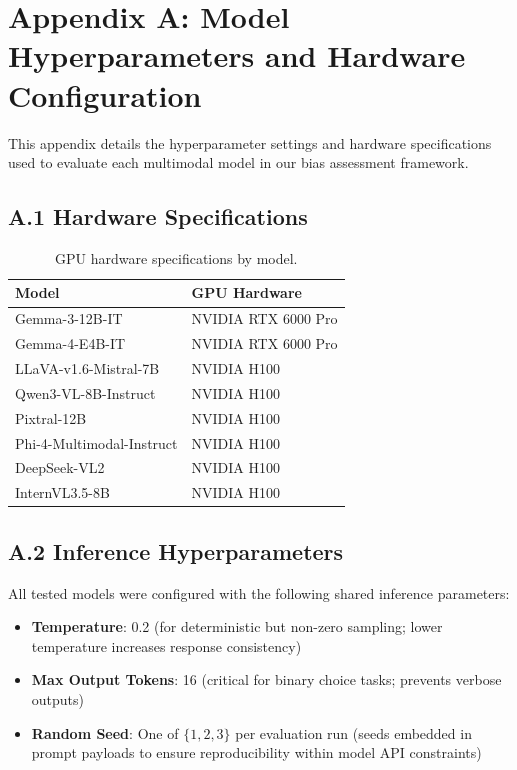 \appendix

\section*{Appendix A: Model Hyperparameters and Hardware Configuration}

This appendix details the hyperparameter settings and hardware specifications used to evaluate each multimodal model in our bias assessment framework.

\subsection*{A.1 Hardware Specifications}

\begin{table}[H]
\centering
\begin{tabular}{|l|l|}
\hline
\textbf{Model} & \textbf{GPU Hardware} \\
\hline
Gemma-3-12B-IT & NVIDIA RTX 6000 Pro \\
Gemma-4-E4B-IT & NVIDIA RTX 6000 Pro \\
LLaVA-v1.6-Mistral-7B & NVIDIA H100 \\
Qwen3-VL-8B-Instruct & NVIDIA H100 \\
Pixtral-12B & NVIDIA H100 \\
Phi-4-Multimodal-Instruct & NVIDIA H100 \\
DeepSeek-VL2 & NVIDIA H100 \\
InternVL3.5-8B & NVIDIA H100 \\
\hline
\end{tabular}
\caption{GPU hardware specifications by model.}
\end{table}

\subsection*{A.2 Inference Hyperparameters}

All tested models were configured with the following shared inference parameters:

\begin{itemize}
    \item \textbf{Temperature}: 0.2 (for deterministic but non-zero sampling; lower temperature increases response consistency)
    \item \textbf{Max Output Tokens}: 16 (critical for binary choice tasks; prevents verbose outputs)
    \item \textbf{Random Seed}: One of $\{1, 2, 3\}$ per evaluation run (seeds embedded in prompt payloads to ensure reproducibility within model API constraints)
\end{itemize}

